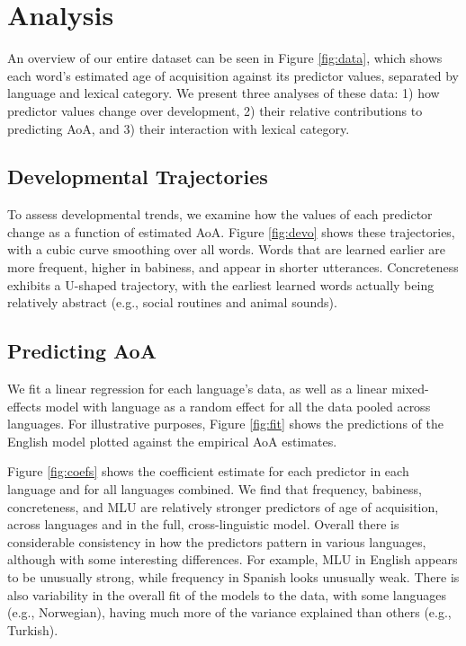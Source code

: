 \documentclass[9pt,twocolumn,twoside]{pnas-new}
\begin{document}
\section*{Analysis}\label{analysis}

An overview of our entire dataset can be seen in Figure \ref{fig:data},
which shows each word's estimated age of acquisition against its
predictor values, separated by language and lexical category. We present
three analyses of these data: 1) how predictor values change over
development, 2) their relative contributions to predicting AoA, and 3)
their interaction with lexical category.

\subsection{Developmental
Trajectories}\label{developmental-trajectories}

To assess developmental trends, we examine how the values of each
predictor change as a function of estimated AoA. Figure \ref{fig:devo}
shows these trajectories, with a cubic curve smoothing over all words.
Words that are learned earlier are more frequent, higher in babiness,
and appear in shorter utterances. Concreteness exhibits a U-shaped
trajectory, with the earliest learned words actually being relatively
abstract (e.g., social routines and animal sounds).

\subsection{Predicting AoA}\label{predicting-aoa}

We fit a linear regression for each language's data, as well as a linear
mixed-effects model with language as a random effect for all the data
pooled across languages. For illustrative purposes, Figure \ref{fig:fit}
shows the predictions of the English model plotted against the empirical
AoA estimates.

Figure \ref{fig:coefs} shows the coefficient estimate for each predictor
in each language and for all languages combined. We find that frequency,
babiness, concreteness, and MLU are relatively stronger predictors of
age of acquisition, across languages and in the full, cross-linguistic
model. Overall there is considerable consistency in how the predictors
pattern in various languages, although with some interesting
differences. For example, MLU in English appears to be unusually strong,
while frequency in Spanish looks unusually weak. There is also
variability in the overall fit of the models to the data, with some
languages (e.g., Norwegian), having much more of the variance explained
than others (e.g., Turkish).
\end{document}
